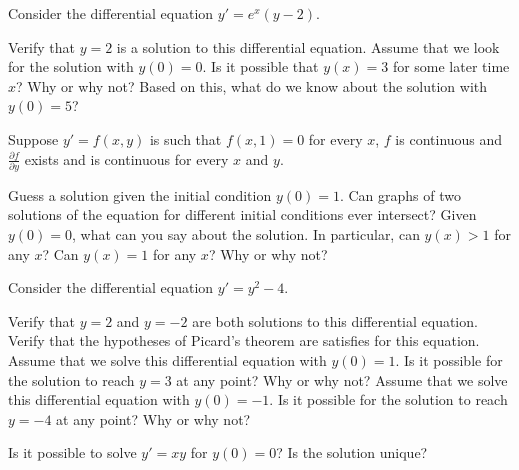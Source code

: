 \begin{exercise}
Consider the differential equation $y' = e^x(y-2)$.
\begin{tasks}
\task Verify that $y = 2$ is a solution to this differential equation.
\task Assume that we look for the solution with $y(0) = 0$. Is it possible that $y(x) = 3$ for some later time $x$? Why or why not?
\task Based on this, what do we know about the solution with $y(0) = 5$?
\end{tasks}
\end{exercise}

\begin{exercise}[challenging]
\pagebreak[2]
Suppose $y' = f(x,y)$ is such that $f(x,1) = 0$ for every $x$,
$f$ is continuous and $\frac{\partial f}{\partial y}$ exists and
is continuous for every $x$ and $y$.
\begin{tasks}
\task
Guess a solution given the initial condition
$y(0) = 1$.
\task
Can graphs of two solutions of the equation for different initial conditions
ever intersect?
\task
Given $y(0) = 0$, what can you say about the solution.  In particular,
can $y(x) > 1$ for any $x$?  Can $y(x) = 1$ for any $x$?  Why or why not?
\end{tasks}
\end{exercise}

\begin{exercise}
Consider the differential equation $y' = y^2 - 4$.
\begin{tasks}
\task Verify that $y=2$ and $y=-2$ are both solutions to this differential equation.
\task Verify that the hypotheses of Picard's theorem are satisfies for this equation.
\task Assume that we solve this differential equation with $y(0) = 1$. Is it possible for the solution to reach $y=3$ at any point? Why or why not?
\task Assume that we solve this differential equation with $y(0) = -1$. Is it possible for the solution to reach $y=-4$ at any point? Why or why not?
\end{tasks}
\end{exercise}

\begin{exercise}\ansMark%
Is it possible to solve $y' = xy$ for $y(0) = 0$?  Is the solution unique?
\end{exercise}

